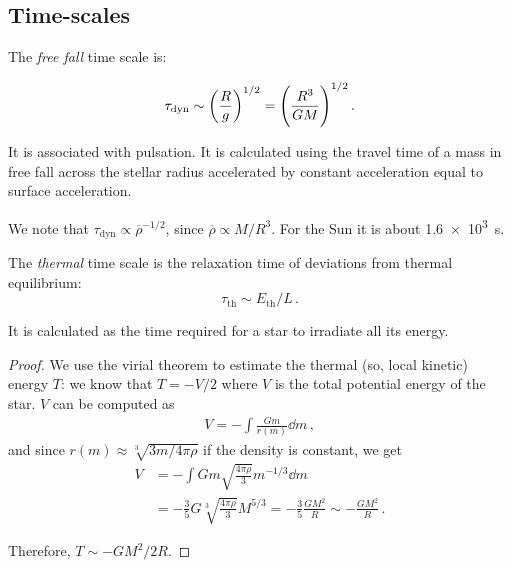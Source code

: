 \documentclass[main.tex]{subfiles}
\begin{document}




\subsection{Time-scales}

The \emph{free fall} time scale is:

\begin{equation}
  \tau_{\text{dyn}} \sim \qty(\frac{R}{g} )^{1/2} = \qty(\frac{R^3}{GM} )^{1/2}\,.
\end{equation}

It is associated with pulsation. It is calculated using the travel time of a mass in free fall across the stellar radius accelerated by constant acceleration equal to surface acceleration.

We note that \(\tau_{\text{dyn}} \propto \overline{\rho} ^{-1/2} \), since \(\overline{\rho} \propto M / R^3\). For the Sun it is about \SI{1.6e3}{s}.

The \emph{thermal} time scale is the relaxation time of deviations from thermal equilibrium:
%
\begin{equation}
  \tau_{\text{th}} \sim E_{\text{th}} / L\,.
\end{equation}

It is calculated as the time required for a star to irradiate all its energy. 

\begin{proof}
We use the virial theorem to estimate the thermal (so, local kinetic) energy \(T\): we know that \(T = - V/2\) where \(V\) is the total potential energy of the star. \(V\) can be computed as 
%
\begin{align}
V = - \int \frac{Gm}{r(m)} \dd{m}
\,,
\end{align}
%
and since \(r(m) \approx \sqrt[3]{3m / 4 \pi \rho }\) if the density is constant, we get 
%
\begin{subequations}
\begin{align}
V &= - \int Gm \sqrt{\frac{4 \pi \rho }{3}} m^{-1/3} \dd{m}  \\
&=- \frac{3}{5} G \sqrt[3]{\frac{4 \pi \rho }{3}} M^{5/3} = -\frac{3}{5} \frac{GM^2}{R} \sim - \frac{GM^2}{R}
\,.
\end{align}
\end{subequations}

Therefore, \(T \sim - GM^2 / 2 R\).  
\end{proof}
\end{document}
